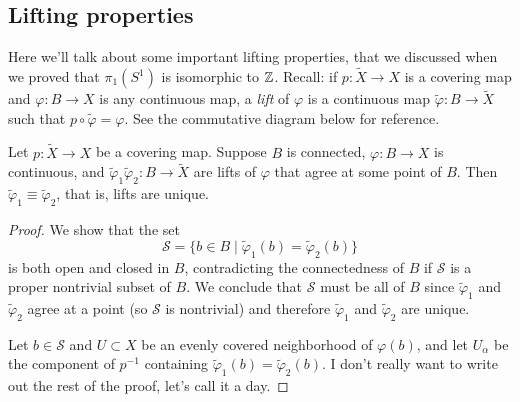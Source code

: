 \subsection{Lifting properties}
Here we'll talk about some important lifting properties, that we discussed when we proved that $\pi_1(S^{1} )$ is isomorphic to $\mathbb{Z}$. Recall: if $p \colon \widetilde X \to X$ is a covering map and $\varphi \colon B \to X$ is any continuous map, a \emph{lift} of $\varphi $ is a continuous map $\widetilde\varphi \colon B \to \widetilde X$ such that $p \circ \widetilde\varphi =\varphi $. See the commutative diagram below for reference.
            \begin{figure}[H]
                \centering
{}
            \end{figure}
            \begin{prop}
  Let $p \colon \widetilde X \to X$ be a covering map. Suppose $B$ is connected, $\varphi \colon B \to X$ is continuous, and $\widetilde\varphi_1 \widetilde\varphi_2 \colon B \to \widetilde X$ are lifts of $\varphi $ that agree at some point of $B$. Then $\widetilde \varphi_1\equiv \widetilde \varphi_2$, that is, lifts are unique.
\end{prop}
\begin{proof}
    We show that the set \[
        \mathcal{S}=\{b\in B \mid \widetilde \varphi_1 (b)=\widetilde\varphi_2(b)  \} 
    \] is both open and closed in $B$, contradicting the connectedness of $B$ if $\mathcal{S} $ is a proper nontrivial subset of $B$. We conclude that $\mathcal{S} $ must be all of $B$ since $\widetilde \varphi_1 $ and $\widetilde\varphi_2 $ agree at a point (so $\mathcal{S} $ is nontrivial) and therefore $\widetilde\varphi_1 $ and $\widetilde\varphi_2 $ are unique.

    Let $b\in \mathcal{S} $ and $U\subset X$ be an evenly covered neighborhood of $\varphi (b)$, and let $U_{\alpha }$ be the component of $p ^{-1}$ containing $\widetilde \varphi_1(b)=\widetilde \varphi_2(b)  $. I don't really want to write out the rest of the proof, let's call it a day.
\end{proof}


